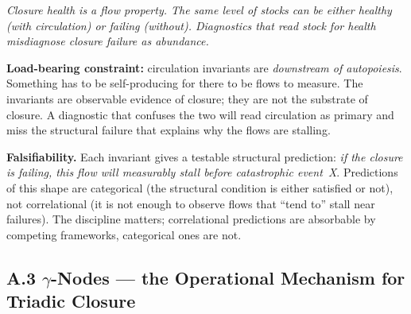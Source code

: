 \documentclass[
]{article}
\begin{document}
\begin{center}

\smallskip
\textit{Closure health is a flow property. The same level of stocks can
be either healthy (with circulation) or failing (without). Diagnostics
that read stock for health misdiagnose closure failure as abundance.}
\end{center}

\textbf{Load-bearing constraint:} circulation invariants are
\emph{downstream of autopoiesis}. Something has to be self-producing
for there to be flows to measure. The invariants are observable
evidence of closure; they are not the substrate of closure. A
diagnostic that confuses the two will read circulation as primary and
miss the structural failure that explains why the flows are stalling.

\textbf{Falsifiability.} Each invariant gives a testable structural
prediction: \emph{if the closure is failing, this flow will measurably
stall before catastrophic event~X}. Predictions of this shape are
categorical (the structural condition is either satisfied or not), not
correlational (it is not enough to observe flows that ``tend to'' stall
near failures). The discipline matters; correlational predictions
are absorbable by competing frameworks, categorical ones are not.

\subsection{\texorpdfstring{A.3 \(\gamma\)-Nodes --- the Operational
Mechanism for Triadic Closure}{A.3 gamma-Nodes --- the Operational
Mechanism for Triadic Closure}}\label{appendix-a-gamma-nodes}
\end{document}
